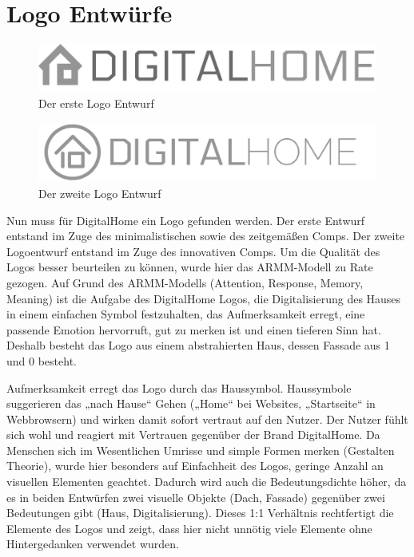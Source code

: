 \section{Logo Entwürfe}
\begin{figure} [tp]
\includegraphics[width=\textwidth]{./img/logo1.png}
\caption{Der erste Logo Entwurf}
\label{logo1}
\end{figure}
\begin{figure} [tp]
\includegraphics[width=\textwidth]{./img/logo2.png}
\caption{Der zweite Logo Entwurf}
\label{logo2}
\end{figure}
Nun muss für DigitalHome ein Logo gefunden werden. Der erste Entwurf entstand im Zuge des minimalistischen sowie des zeitgemäßen Comps. Der zweite Logoentwurf entstand im Zuge des innovativen Comps. Um die Qualität des Logos besser beurteilen zu können, wurde hier das ARMM-Modell zu Rate gezogen. Auf Grund des ARMM-Modells (Attention, Response, Memory, Meaning) ist die Aufgabe des DigitalHome Logos, die Digitalisierung des Hauses in einem einfachen Symbol festzuhalten, das Aufmerksamkeit erregt, eine passende Emotion hervorruft, gut zu merken ist und einen tieferen Sinn hat. Deshalb besteht das Logo aus einem abstrahierten Haus, dessen Fassade aus 1 und 0 besteht.

Aufmerksamkeit erregt das Logo durch das Haussymbol. Haussymbole suggerieren das „nach Hause“ Gehen („Home“ bei Websites, „Startseite“ in Webbrowsern) und wirken damit sofort vertraut auf den Nutzer. Der Nutzer fühlt sich wohl und reagiert mit Vertrauen gegenüber der Brand DigitalHome. Da Menschen sich im Wesentlichen Umrisse und simple Formen merken (Gestalten Theorie), wurde hier besonders auf Einfachheit des Logos, geringe Anzahl an visuellen Elementen geachtet. Dadurch wird auch die Bedeutungsdichte höher, da es in beiden Entwürfen zwei visuelle Objekte (Dach, Fassade) gegenüber zwei Bedeutungen gibt (Haus, Digitalisierung). Dieses 1:1 Verhältnis rechtfertigt die Elemente des Logos und zeigt, dass hier nicht unnötig viele Elemente ohne Hintergedanken verwendet wurden.

